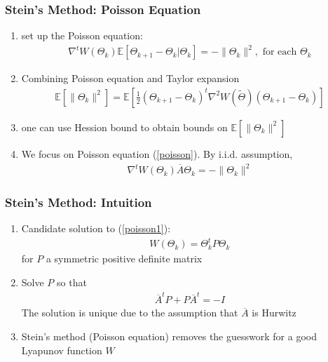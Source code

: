 \documentclass[t,10pt]{beamer}
\newcommand{\E}{\mathbb{E}}
\theoremstyle{remark}
\begin{document}



\begin{frame}
\frametitle{Stein's Method: Poisson Equation}
\begin{enumerate}
\item set up the Poisson equation:
\begin{align} \label{poisson}
\nabla^t W(\Theta_k) \E[\Theta_{k+1}-\Theta_k \big| \Theta_k] = -\|\Theta_k\|^2, \text{ for each } \Theta_k
\end{align}
\item Combining Poisson equation and Taylor expansion
\begin{align}
\E[\|\Theta_k\|^2] = \E\left[ \frac{1}{2}(\Theta_{k+1}-\Theta_k)^t \nabla^2 W(\tilde{\Theta})(\Theta_{k+1}-\Theta_k)  \right]
\end{align}
\item one can use Hession bound to obtain bounds on $\E[\|\Theta_k\|^2]$
\item We focus on Poisson equation (\ref{poisson}). By i.i.d. assumption, 
\begin{align} \label{poisson1}
\nabla^tW(\Theta_k)\overline{A}\Theta_k = -\|\Theta_k\|^2
\end{align}
\end{enumerate}

\end{frame}












\begin{frame}
\frametitle{Stein's Method:  Intuition}
\begin{enumerate}
\item Candidate solution to (\ref{poisson1}):
\begin{align}
W(\Theta_k) = \Theta_k^tP\Theta_k
\end{align}
for $P$ a symmetric positive definite matrix
\item Solve $P$ so that 
\begin{align}
\overline{A}^tP + P\overline{A}^t = -I
\end{align}
The solution is unique due to the assumption that $\overline{A}$ is Hurwitz
\item Stein's method (Poisson equation) removes the guesswork for a good Lyapunov function $W$ 
\end{enumerate}

\end{frame}
\end{document}
